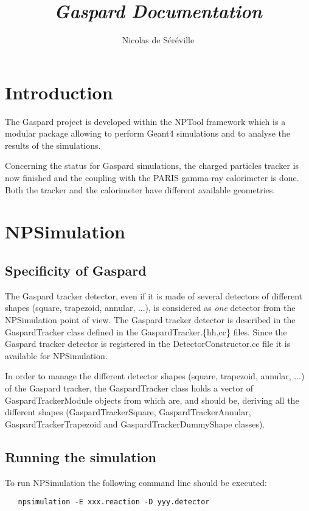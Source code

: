 \documentclass[a4paper,12pt]{article}
\begin{document}
\title{\emph{Gaspard Documentation}}
\author{Nicolas de S\'er\'eville}
\maketitle 

\pagebreak
\tableofcontents
\pagebreak


\section{Introduction}
The Gaspard project is developed within the NPTool framework which is a 
modular package allowing to perform Geant4 simulations and to analyse the 
results of the simulations. 

Concerning the status for Gaspard simulations, the charged particles tracker
is now finished and the coupling with the PARIS gamma-ray calorimeter is
done. Both the tracker and the calorimeter have different available geometries.


\section{NPSimulation}
\subsection{Specificity of Gaspard}
The Gaspard tracker detector, even if it is made of several detectors of
different shapes (square, trapezoid, annular, ...), is considered as {\it one} 
detector from the NPSimulation point of view. The Gaspard tracker detector 
is described in the GaspardTracker class defined in the GaspardTracker.\{hh,cc\} 
files. Since the Gaspard tracker detector is registered in the 
DetectorConstructor.cc file it is available for NPSimulation.

In order to manage the different detector shapes (square, trapezoid, annular, 
...) of the Gaspard tracker, the GaspardTracker class holds a vector of 
GaspardTrackerModule objects from which are, and should be, deriving all 
the different shapes (GaspardTrackerSquare, GaspardTrackerAnnular,
GaspardTrackerTrapezoid and GaspardTrackerDummyShape classes).


\subsection{Running the simulation}
To run NPSimulation the following command line should be executed: 

\begin{verbatim}
   npsimulation -E xxx.reaction -D yyy.detector
\end{verbatim}
\end{document}
